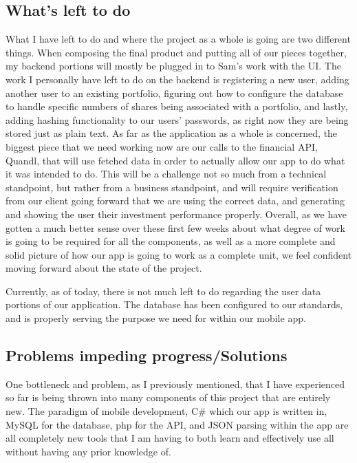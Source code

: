 \documentclass[letterpaper,10pt,titlepage,journal,compsoc,draftclsnofoot,onecolumn]{IEEEtran}
\begin{document}
\subsection{What's left to do}

What I have left to do and where the project as a whole is going are two different things. When composing the final product and putting all of our pieces together, my backend portions will mostly be plugged in to Sam's work with the UI. The work I personally have left to do on the backend is registering a new user, adding another user to an existing portfolio, figuring out how to configure the database to handle specific numbers of shares being associated with a portfolio, and lastly, adding hashing functionality to our users' passwords, as right now they are being stored just as plain text. As far as the application as a whole is concerned, the biggest piece that we need working now are our calls to the financial API, Quandl, that will use fetched data in order to actually allow our app to do what it was intended to do. This will be a challenge not so much from a technical standpoint, but rather from a business standpoint, and will require verification from our client going forward that we are using the correct data, and generating and showing the user their investment performance properly. Overall, as we have gotten a much better sense over these first few weeks about what degree of work is going to be required for all the components, as well as a more complete and solid picture of how our app is going to work as a complete unit, we feel confident moving forward about the state of the project.

Currently, as of today, there is not much left to do regarding the user data portions of our application. The database has been configured to our standards, and is properly serving the purpose we need for within our mobile app.

\subsection{Problems impeding progress/Solutions}

One bottleneck and problem, as I previously mentioned, that I have experienced so far is being thrown into many components of this project that are entirely new. The paradigm of mobile development, C\# which our app is written in, MySQL for the database, php for the API, and JSON parsing within the app are all completely new tools that I am having to both learn and effectively use all without having any prior knowledge of.
\end{document}
